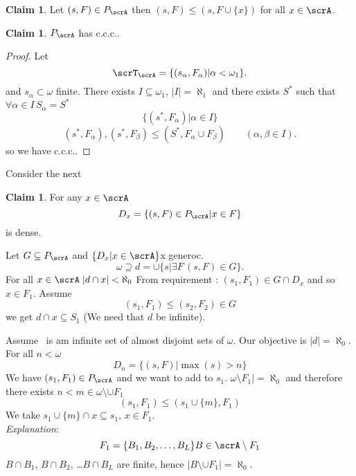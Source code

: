 \documentclass[11pt,pdftex,twoside,a4paper]{article}
\newcommand{\ccc}{c.c.c.}
\theoremstyle{definition}
\newtheorem{claim}[thm]{Claim}
\begin{document}
\begin{claim}
Let \((s,F)\in P_\scrA\)
then 
\((s,F)\leq (s,F\cup\{x\})\)
for all \(x\in\scrA\).
\end{claim}

\begin{claim}
\(P_\scrA\) has \ccc.
\end{claim}
\begin{proof}
Let 
\begin{equation*}
\scrT_\scrA = \{(s_\alpha, F_\alpha)|\alpha < \omega_1\}.
\end{equation*}
and \(s_\alpha \subset \omega\) finite.
There exists \(I \subseteq \omega_1\), \(|I| = \aleph_1\)
and there exists \(S^*\) such that \(\forall \alpha\in I\, S_\alpha=S^*\)
\begin{equation*}
\{(s^*,F_\alpha)| \alpha\in I\}
\end{equation*}
\begin{equation*}
(s^*,F_\alpha),(s^*,F_\beta) \leq (S^*,F_\alpha\cup F_\beta)
   \qquad (\alpha,\beta\in I).
\end{equation*}
so we have \ccc.
\end{proof}

Consider the next
\begin{claim}
For any \(x\in \scrA\)
\begin{equation*}
D_x = \{(s, F)\in P_\scrA | x\in F\}
\end{equation*}
is dense.
\end{claim}
Let \(G\subseteq P_\scrA\) and \(\{D_x|x\in\scrA\}\)x generoc.
\begin{equation*}
 \omega \supseteq d = \cup \{s|\exists F\,(s,F)\in G\}.
\end{equation*}
For all \(x\in \scrA \; |d\cap x| < \aleph_0\)
From requirement : \((s_1,F_1) \in G\cap D_x\) and so \(x\in F_1\).
Assume
\begin{equation*}
 (s_1,F_1) \leq (s_2,F_2) \in G
\end{equation*}
we get \(d\cap x\subseteq S_1\)
(We need that $d$ be infinite).

Assume \scrA\ is am infinite set of almost disjoint sets of \(\omega\).
Our objective is \(|d|=\aleph_0\).
For all \(n < \omega\)
\begin{equation*}
D_n = \{(s,F)| \max(s)>n\} %
\end{equation*}
We have \((s_1,F_1)\in P_\scrA\)
and we want to add to \(s_1\).
\(\omega \setminus F_1| = \aleph_0\) and therefore
there exists \(n < m \in \omega \setminus \cup F_1\)
\begin{equation*}
(s_1,F_1) \leq (s_1\cup\{m\}, F_1)
\end{equation*}
We take \(s_1\cup\{m\}\cap x \subseteq s_1\), \(x \in F_1\).
\\
\emph{Explanation}:
\begin{equation*}
 F_1 = \{B_1,B_2,\ldots, B_L\}\\
B \in \scrA \setminus F_1 \\
\end{equation*}
\(B\cap B_1\), \(B\cap B_2\), \ldots \(B\cap B_L\) are finite,
hence \(|B \setminus \cup F_1| = \aleph_0\).
\end{document}
